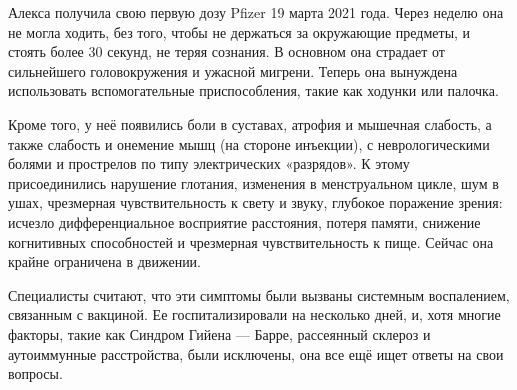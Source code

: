 Алекса получила свою первую дозу Pfizer 19 марта 2021 года. Через неделю она не
могла ходить, без того, чтобы не держаться за окружающие предметы, и стоять
более 30 секунд, не теряя сознания. В основном она страдает от сильнейшего
головокружения и ужасной мигрени. Теперь она вынуждена использовать
вспомогательные приспособления, такие как ходунки или палочка.

Кроме того, у неё появились боли в суставах, атрофия и мышечная слабость, а
также слабость и онемение мышц (на стороне инъекции), с неврологическими болями
и прострелов по типу электрических «разрядов». К этому присоединились нарушение
глотания, изменения в менструальном цикле, шум в ушах, чрезмерная
чувствительность к свету и звуку, глубокое поражение зрения: исчезло
дифференциальное восприятие расстояния, потеря памяти, снижение когнитивных
способностей и чрезмерная чувствительность к пище. Сейчас она крайне ограничена
в движении.

Специалисты считают, что эти симптомы были вызваны системным воспалением,
связанным с вакциной. Ее госпитализировали на несколько дней, и, хотя многие
факторы, такие как Синдро‌м Гийе‌на — Барре‌, рассеянный склероз и аутоиммунные
расстройства, были исключены, она все ещё ищет ответы на свои вопросы.
